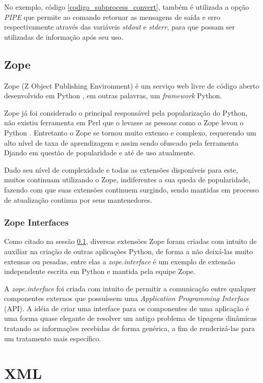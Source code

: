 No exemplo, código \ref{codigo_subprocess_convert}, também é utilizada a opção \textit{PIPE} que permite ao comando retornar as mensagens de saída e erro respectivamente através das variáveis \textit{stdout} e \textit{stderr}, para que possam ser utilizadas de informação após seu uso.


\subsection{Zope}
\label{zope}

Zope (Z Object Publishing Environment) é um serviço web livre de código aberto desenvolvido em Python \cite{ZOPE2}, em outras palavras, um \textit{framework} Python.

Zope já foi considerado o principal responsável pela popularização do Python, não existiu ferramenta em Perl que o levasse as pessoas como o Zope levou o Python \cite{UDELL}. Entretanto o Zope se tornou muito extenso e complexo, requerendo um alto nível de taxa de aprendizagem e assim sendo ofuscado pela ferramenta Djando em questão de popularidade e até de uso atualmente.

Dado seu nível de complexidade e todas as extensões disponíveis para este, muitos continuam utilizando o Zope, indiferentes a sua queda de popularidade, fazendo com que suas extensões continuem surgindo, sendo mantidas em processo de atualização continua por seus mantenedores.


\subsubsection{Zope Interfaces}

Como citado na sessão \ref{zope}, diversas extensões Zope foram criadas com intuito de auxiliar na criação de outras aplicações Python, de forma a não deixá-las muito extensas ou pesadas, entre elas a \textit{zope.interface} é um exemplo de extensão independente escrita em Python e mantida pela equipe Zope.

A \textit{zope.interface} foi criada com intuito de permitir a comunicação entre qualquer componentes externos que possuíssem uma \textit{Application Programming Interface} (API). A idéia de criar uma interface para os componentes de uma aplicação é uma forma quase elegante de resolver um antigo problema de tipagens dinâmicas tratando as informações recebidas de forma genérica, a fim de renderizá-las para um tratamento mais específico.


\section{XML}

